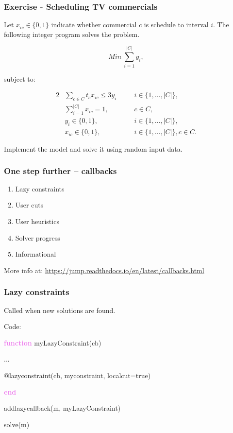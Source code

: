 \documentclass{beamer}
\begin{document}
\begin{frame}
  \frametitle{Exercise - Scheduling TV commercials}

  \footnotesize

  Let $x_{ic} \in \{0, 1\}$ indicate whether commercial $c$ is schedule to interval $i$. The following integer program solves the problem.
  
  \begin{equation*}
  Min\ \sum_{i=1}^{|C|} y_i,
  \end{equation*}

  subject to:

  \vspace{-0.7cm}
  \begin{alignat*}{2}
    &\sum_{c \in C} t_c x_{ic} \leq 3 y_i && \quad i \in \{1, \ldots, |C|\},\\
    & \sum_{i=1}^{|C|} x_{ic} = 1, && \quad c \in C,\\
    & y_i \in \{0, 1\}, && \quad i \in \{1, \ldots, |C|\},\\
    & x_{ic} \in \{0, 1\}, && \quad i \in \{1, \ldots, |C|\}, c \in C. 
  \end{alignat*}

Implement the model and solve it using random input data.
  
\end{frame}


\begin{frame}
  \frametitle{One step further -- callbacks}

  \begin{enumerate}
  \item [] Lazy constraints
  \item [] User cuts
  \item [] User heuristics
  \item [] Solver progress
  \item [] Informational
  \end{enumerate}

    \vfill \footnotesize
  More info at: \url{https://jump.readthedocs.io/en/latest/callbacks.html}
\end{frame}


\begin{frame}
  \frametitle{Lazy constraints}
  Called when new solutions are found.

  \begin{block}{Code:}\footnotesize
    
    \textcolor{violet}{\textbf{function}} myLazyConstraint(cb)
    
    \hspace{1cm}    ...
    
    \hspace{1cm}    @lazyconstraint(cb, myconstraint, localcut=true)

    \textcolor{violet}{\bf end}
    
    addlazycallback(m, myLazyConstraint)

    solve(m)
  \end{block}

\end{frame}
\end{document}
